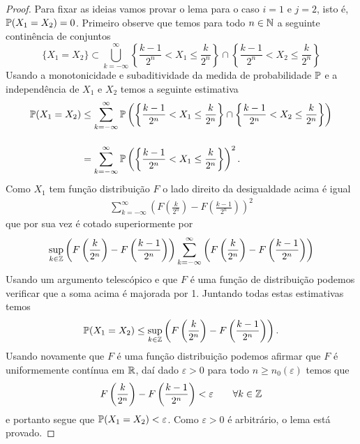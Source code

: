 \begin{proof}
Para fixar as ideias vamos provar o lema para 
o caso $i=1$ e $j=2$, isto é, $\P(X_1=X_2)=0$.
Primeiro observe que temos para todo $n\in\N$ 
a seguinte continência de conjuntos 
	\[
	\{X_1=X_2\}
	\subset
	\bigcup_{k=-\infty}^{\infty}
	\left\{
		\frac{k-1}{2^n}<X_1\leq \frac{k}{2^n}
	\right\}
	\cap
	\left\{
		\frac{k-1}{2^n}<X_2\leq \frac{k}{2^n}
	\right\}
	\]
Usando a monotonicidade e subaditividade da medida
de probabilidade $\P$ e a independência de 
$X_1$ e $X_2$ temos a seguinte estimativa
	\begin{align*}
	\P(X_1=X_2)
	&\leq
	\sum_{k=-\infty}^{\infty}
	\P \left(
		\left\{
			\frac{k-1}{2^n}<X_1\leq \frac{k}{2^n}
		\right\}
		\cap
		\left\{
			\frac{k-1}{2^n}<X_2\leq \frac{k}{2^n}
		\right\}
	\right)
	\\[0.4cm]
	&=
	\sum_{k=-\infty}^{\infty}
	\P \left(
		\left\{
			\frac{k-1}{2^n}<X_1\leq \frac{k}{2^n}
		\right\}
	\right)^2.
	\end{align*}
%
%
%
Como $X_1$ tem função distribuição $F$ o lado 
direito da desigualdade acima é igual 
	\begin{align*}
	\sum_{k=-\infty}^{\infty}
	\left(
		F\left(\frac{k}{2^n}\right)
		-
		F\left(\frac{k-1}{2^n}\right)
	\right)^2
	\end{align*}
que por sua vez é cotado superiormente por 
	\begin{align*}
	\sup_{k\in\Z}
		\left(
			F\left(\frac{k}{2^n}\right)
			-
			F\left(\frac{k-1}{2^n}\right)
		\right)
	\sum_{k=-\infty}^{\infty}
	\left(
		F\left(\frac{k}{2^n}\right)
		-
		F\left(\frac{k-1}{2^n}\right)
	\right)	
	\end{align*}
Usando um argumento telescópico e que $F$ é uma 
função de distribuição podemos verificar que a soma
acima é majorada por 1. Juntando todas estas estimativas
temos
	\begin{align*}
	\P(X_1=X_2)
	\leq 
	\sup_{k\in\Z}
		\left(
			F\left(\frac{k}{2^n}\right)
			-
			F\left(\frac{k-1}{2^n}\right)
		\right).
	\end{align*}
 Usando novamente que $F$ é uma função distribuição podemos
 afirmar que $F$ é uniformemente contínua em $\R$, daí dado 
 $\varepsilon>0$ para todo $n\geq n_0(\varepsilon)$ temos que 
	\[
			F\left(\frac{k}{2^n}\right)
			-
			F\left(\frac{k-1}{2^n}\right)
			< 
			\varepsilon
			\qquad
			\forall k\in\Z
	\]  
e portanto segue que $\P(X_1=X_2)< \varepsilon$. 
Como $\varepsilon>0$ é arbitrário, 
o lema está provado.
\end{proof}



